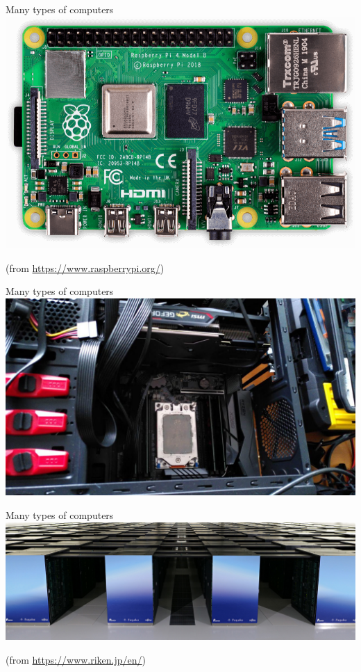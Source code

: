 \begin{frame}{Many types of computers \insertcontinuationtext}
  \includegraphics[width=\textwidth]{images/rpi-compressed.png}

  {\tiny (from \url{https://www.raspberrypi.org/})}
\end{frame}

\begin{frame}{Many types of computers \insertcontinuationtext}
  \includegraphics[width=\textwidth]{images/desktop.jpg}
\end{frame}

\begin{frame}{Many types of computers \insertcontinuationtext}
  \includegraphics[width=\textwidth]{images/fugaku.jpg}

  {\tiny (from \url{https://www.riken.jp/en/})}
\end{frame}

